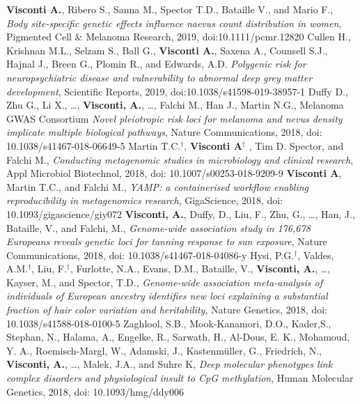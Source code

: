 \documentclass[a4paper,10pt]{article}
\begin{document}
{\begin{itemize}
		 \textbf{Visconti A.}, Ribero S., Sanna M., Spector T.D., Bataille V., and Mario F., \emph{Body site-specific genetic effects influence naevus count distribution in women}, Pigmented Cell \& Melanoma Research, 2019, doi:10.1111/pcmr.12820
		 Cullen H., Krishnan M.L., Selzam S., Ball G., \textbf{Visconti A.}, Saxena A., Counsell S.J., Hajnal J., Breen G., Plomin R., and Edwards, A.D. \emph{Polygenic risk for neuropsychiatric disease and vulnerability to abnormal deep grey matter development}, Scientific Reports, 2019, doi:10.1038/s41598-019-38957-1
		 Duffy D., Zhu G., Li X., \dots, \textbf{Visconti, A.}, \dots, Falchi M., Han J., Martin N.G., Melanoma GWAS Consortium \emph{Novel pleiotropic risk loci for melanoma and nevus density implicate multiple biological pathways}, Nature Communications, 2018, doi: 10.1038/s41467-018-06649-5		
		 Martin T.C.$^{\textbf{$\dag $}}$, \textbf{Visconti A}$^{\textbf{$\dag $}}$ , Tim D. Spector, and Falchi M., \emph{Conducting metagenomic studies in microbiology and clinical research}, Appl Microbiol Biotechnol, 2018, doi: 10.1007/s00253-018-9209-9
		 \textbf{Visconti A}, Martin T.C., and Falchi M., \emph{YAMP: a containerised workflow enabling reproducibility in metagenomics research}, GigaScience, 2018, doi: 10.1093/gigascience/giy072
		  \textbf{Visconti, A.}, Duffy, D., Liu, F., Zhu, G., \dots, Han, J., Bataille, V., and Falchi, M., \emph{Genome-wide association study in 176,678 Europeans reveals genetic loci for tanning response to sun exposure}, Nature Communications, 2018, doi: 10.1038/s41467-018-04086-y
		  Hysi, P.G.$^{\textbf{$\dag $}}$, Valdes, A.M.$^{\textbf{$\dag $}}$, Liu, F.$^{\textbf{$\dag $}}$, Furlotte, N.A., Evans, D.M., Bataille, V., \textbf{Visconti, A.}, \dots, Kayser, M., and Spector, T.D., \emph{Genome-wide association meta-analysis of individuals of European ancestry identifies new loci explaining a substantial fraction of hair color variation and heritability}, Nature Genetics, 2018, doi: 10.1038/s41588-018-0100-5
 		 Zaghlool, S.B., Mook-Kanamori, D.O., Kader,S., Stephan, N., Halama, A., Engelke, R., Sarwath, H., Al-Dous, E. K., Mohamoud, Y. A., Roemisch-Margl, W., Adamski, J., Kastenmüller, G., Friedrich, N., \textbf{Visconti, A.}, \dots, Malek, J.A., and Suhre K, \emph{Deep molecular phenotypes link complex disorders and physiological insult to CpG methylation}, Human Molecular Genetics, 2018, doi: 10.1093/hmg/ddy006
		
		
	\end{itemize}
}
\end{document}
